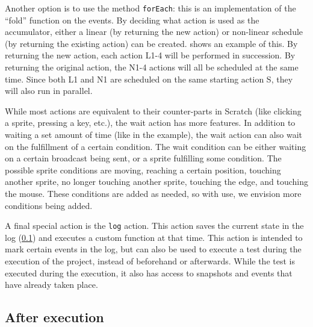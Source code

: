 \documentclass[../main]{subfiles}
\begin{document}
Another option is to use the method \texttt{forEach}: this is an implementation of the ``fold'' function on the events.
By deciding what action is used as the accumulator, either a linear (by returning the new action) or non-linear schedule (by returning the existing action) can be created.
 shows an example of this.
By returning the new action, each action L1-4 will be performed in succession.
By returning the original action, the N1-4 actions will all be scheduled at the same time.
Since both L1 and N1 are scheduled on the same starting action S, they will also run in parallel.

While most actions are equivalent to their counter-parts in Scratch (like clicking a sprite, pressing a key, etc.), the wait action has more features.
In addition to waiting a set amount of time (like in the example), the wait action can also wait on the fulfillment of a certain condition.
The wait condition can be either waiting on a certain broadcast being sent, or a sprite fulfilling some condition.
The possible sprite conditions are moving, reaching a certain position, touching another sprite, no longer touching another sprite, touching the edge, and touching the mouse.
These conditions are added as needed, so with use, we envision more conditions being added.

A final special action is the \texttt{log} action.
This action saves the current state in the log (\cref{subsec:after-execution}) and executes a custom function at that time.
This action is intended to mark certain events in the log, but can also be used to execute a test during the execution of the project, instead of beforehand or afterwards.
While the test is executed during the execution, it also has access to snapshots and events that have already taken place.

\subsection{After execution}\label{subsec:after-execution}
\end{document}
